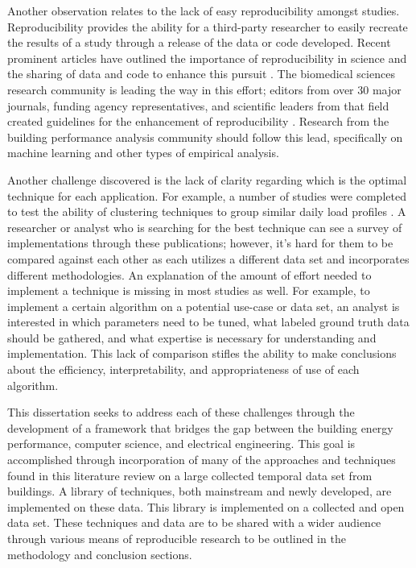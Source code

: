 Another observation relates to the lack of easy reproducibility amongst studies. Reproducibility provides the ability for a third-party researcher to easily recreate the results of a study through a release of the data or code developed. Recent prominent articles have outlined the importance of reproducibility in science \citep{_journals_2014} and the sharing of data and code to enhance this pursuit \citep{_code_2014}. The biomedical sciences research community is leading the way in this effort; editors from over 30 major journals, funding agency representatives, and scientific leaders from that field created guidelines for the enhancement of reproducibility \citep{_journals_2014}. Research from the building performance analysis community should follow this lead, specifically on machine learning and other types of empirical analysis.

Another challenge discovered is the lack of clarity regarding which is the optimal technique for each application. For example, a number of studies were completed to test the ability of clustering techniques to group similar daily load profiles \citep{chicco_support_2009,de_silva_data_2011,green_divide_2014,gullo_low-voltage_2009,lavin_clustering_2014,ramos_typical_2012,shahzadeh_improving_2015}. A researcher or analyst who is searching for the best technique can see a survey of implementations through these publications; however, it's hard for them to be compared against each other as each utilizes a different data set and incorporates different methodologies. An explanation of the amount of effort needed to implement a technique is missing in most studies as well. For example, to implement a certain algorithm on a potential use-case or data set, an analyst is interested in which parameters need to be tuned, what labeled ground truth data should be gathered, and what expertise is necessary for understanding and implementation. This lack of comparison stifles the ability to make conclusions about the efficiency, interpretability, and appropriateness of use of each algorithm. 

This dissertation seeks to address each of these challenges through the development of a framework that bridges the gap between the building energy performance, computer science, and electrical engineering. This goal is accomplished through incorporation of many of the approaches and techniques found in this literature review on a large collected temporal data set from buildings. A library of techniques, both mainstream and newly developed, are implemented on these data. This library is implemented on a collected and open data set. These techniques and data are to be shared with a wider audience through various means of reproducible research to be outlined in the methodology and conclusion sections. 
 

